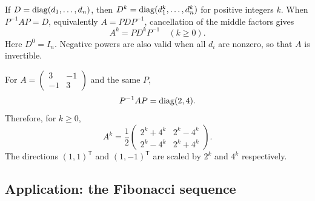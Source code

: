 If $D=\operatorname{diag}(d_1,\ldots,d_n)$, then
$D^k=\operatorname{diag}(d_1^k,\ldots,d_n^k)$ for positive integers $k$.
When $P^{-1}AP=D$, equivalently $A=PDP^{-1}$, cancellation of the middle
factors gives
\[
 \boxed{A^k=PD^kP^{-1}\quad(k\geq0).}
\]
Here $D^0=I_n$. Negative powers are also valid when all $d_i$ are
nonzero, so that $A$ is invertible.

\begin{example}
For $A=\begin{pmatrix}3&-1\\-1&3\end{pmatrix}$ and the same $P$,
\[
 P^{-1}AP=\operatorname{diag}(2,4).
\]
Therefore, for $k\geq0$,
\[
 A^k=\frac12
 \begin{pmatrix}
 2^k+4^k&2^k-4^k\\
 2^k-4^k&2^k+4^k
 \end{pmatrix}.
\]
The directions $(1,1)^{\mathsf T}$ and $(1,-1)^{\mathsf T}$ are
scaled by $2^k$ and $4^k$ respectively.
\end{example}

\subsection{Application: the Fibonacci sequence}

